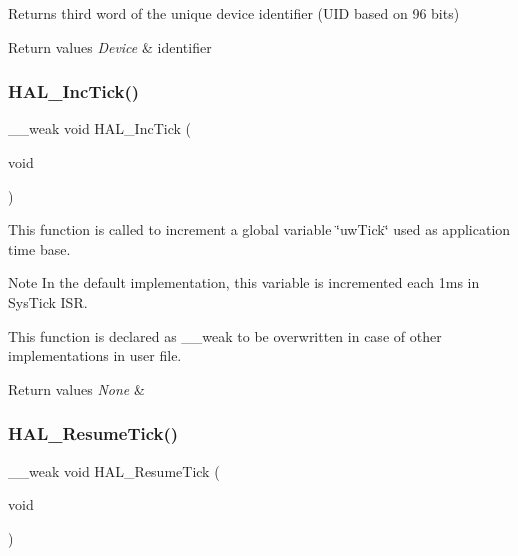 Returns third word of the unique device identifier (U\+ID based on 96 bits) 


\begin{DoxyRetVals}{Return values}
{\em Device} & identifier \\
\hline
\end{DoxyRetVals}
\mbox{\label{group___h_a_l___exported___functions___group2_gaba5b726bfedd013bf7bb5a51d5c4f188}} 
\subsubsection{\texorpdfstring{HAL\_IncTick()}{HAL\_IncTick()}}
{\footnotesize\ttfamily \+\_\+\+\_\+weak void H\+A\+L\+\_\+\+Inc\+Tick (\begin{DoxyParamCaption}\item[{void}]{ }\end{DoxyParamCaption})}



This function is called to increment a global variable \char`\"{}uw\+Tick\char`\"{} used as application time base. 

\begin{DoxyNote}{Note}
In the default implementation, this variable is incremented each 1ms in Sys\+Tick I\+SR. 

This function is declared as \+\_\+\+\_\+weak to be overwritten in case of other implementations in user file. 
\end{DoxyNote}

\begin{DoxyRetVals}{Return values}
{\em None} & \\
\hline
\end{DoxyRetVals}
\mbox{\label{group___h_a_l___exported___functions___group2_gac3fa17aa85e357e3f1af56ad110d2e97}} 
\subsubsection{\texorpdfstring{HAL\_ResumeTick()}{HAL\_ResumeTick()}}
{\footnotesize\ttfamily \+\_\+\+\_\+weak void H\+A\+L\+\_\+\+Resume\+Tick (\begin{DoxyParamCaption}\item[{void}]{ }\end{DoxyParamCaption})}



